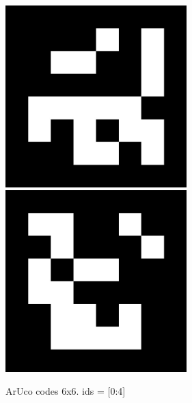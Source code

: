 \documentclass[12pt,a4paper]{article}
\begin{document}
\begin{figure}[H]
\vspace{2 cm}
\includegraphics[width=70mm]{6x6marker_002.jpg}
\hspace{2 cm}
\includegraphics[width=70mm]{6x6marker_003.jpg}

\vspace{2 cm}
\caption{ArUco codes 6x6. ids = [0:4]}
\label{fig:name}



\end{figure}
\end{document}
